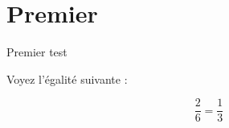 \documentclass{beamer}
\begin{document}
\section{Premier}

\begin{frame}{Premier}
  test

  Voyez l'égalité suivante :

$$\frac{2}{6}=\frac{1}{3}$$
\end{frame}
\end{document}
